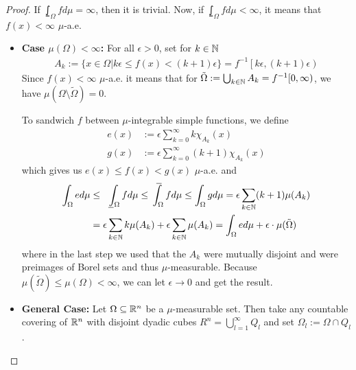 \begin{proof}
  If $\lowint_{\Omega} f d \mu = \infty$, then it is trivial.
  Now, if $\lowint_{\Omega}f d \mu < \infty$, it means that $f(x) < \infty$ $\mu$-a.e.

  \begin{itemize}
    \item \textbf{Case $\mu(\Omega) < \infty$:}
      For all $\epsilon > 0$, set for $k \in \mathbb{N}$
      \begin{align*}
        A_k := \{x \in \Omega \big\vert k \epsilon \leq f(x) < (k+1)\epsilon\} = f^{-1}\left[k \epsilon, (k+1)\epsilon\right)
      \end{align*}
      Since $f(x) < \infty$ $\mu$-a.e. it means that for $\tilde{\Omega} := \bigcup_{k \in \mathbb{N}} A_k = f^{-1}[0,\infty)$, we have $\mu(\Omega \setminus \tilde{\Omega}) = 0$.

      To sandwich $f$ between $\mu$-integrable simple functions, we define
      \begin{align*}
        e(x) &:= \epsilon \sum_{k=0}^{\infty} k \chi_{A_k}(x)\\
        g(x) &:= \epsilon \sum_{k=0}^{\infty} (k+1) \chi_{A_k}(x)
      \end{align*}
      which gives us $e(x) \leq f(x) < g(x)$ $\mu$-a.e. and
      \begin{align*}
        \int_{\Omega}e d \mu 
        &\leq 
        \lowint_{\Omega} f d \mu 
        \leq \upint_{\Omega} f d \mu 
        \leq \int_{\Omega} g d \mu
        = \epsilon\sum_{k \in \N}(k+1) \mu(A_k)\\
        &= \epsilon \sum_{k\in \N} k \mu(A_k) + \epsilon \sum_{k \in \N} \mu(A_k)
        = \int_{\Omega} e d \mu + \epsilon \cdot \mu(\tilde{\Omega})
      \end{align*}
      where in the last step we used that the $A_k$ were mutually disjoint and were preimages of Borel sets and thus $\mu$-measurable.
      Because $\mu(\tilde{\Omega}) \leq \mu(\Omega) < \infty$, we can let $\epsilon \to 0$ and get the result.

    \item \textbf{General Case:} Let $\Omega \subseteq \mathbb{R}^{n}$ be a $\mu$-measurable set. 
      Then take any countable covering of $\mathbb{R}^{n}$ with disjoint dyadic cubes $R^{n} = \bigcup_{l=1}^{\infty}Q_l$ and set $\Omega_l := \Omega \cap Q_l$.


\end{itemize}
\end{proof}
